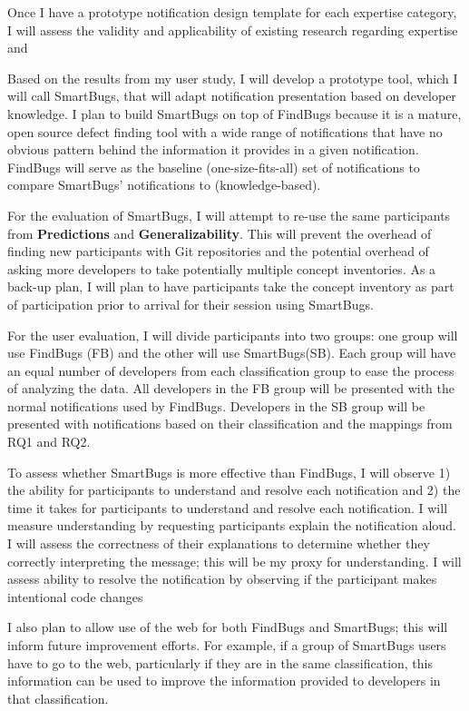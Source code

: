 \documentclass{llncs}
\begin{document}
Once I have a prototype notification design template for each expertise category, I will assess the validity and applicability of existing research regarding expertise and 

Based on the results from my user study, I will develop a prototype tool, which I will call SmartBugs, that will adapt notification presentation based on developer knowledge. I plan to build SmartBugs on top of FindBugs because it is a mature, open source defect finding tool with a wide range of notifications that have no obvious pattern behind the information it provides in a given notification. FindBugs will serve as the baseline (one-size-fits-all) set of notifications to compare SmartBugs' notifications to (knowledge-based).

For the evaluation of SmartBugs, I will attempt to re-use the same participants from \textbf{Predictions} and \textbf{Generalizability}. This will prevent the overhead of finding new participants with Git repositories and the potential overhead of asking more developers to take potentially multiple concept inventories.
As a back-up plan, I will plan to have participants take the concept inventory as part of participation prior to arrival for their session using SmartBugs.

For the user evaluation, I will divide participants into two groups: one group will use FindBugs (FB) and the other will use SmartBugs(SB). Each group will have an equal number of developers from each classification group to ease the process of analyzing the data. All developers in the FB group will be presented with the normal notifications used by FindBugs. Developers in the SB group will be presented with notifications based on their classification and the mappings from RQ1 and RQ2.

To assess whether SmartBugs is more effective than FindBugs, I will observe 1) the ability for participants to understand and resolve each notification and 2) the time it takes for participants to understand and resolve each notification. I will measure understanding by requesting participants explain the notification aloud. I will assess the correctness of their explanations to determine whether they correctly interpreting the message; this will be my proxy for understanding. I will assess ability to resolve the notification by observing if the participant makes intentional code changes

I also plan to allow use of the web for both FindBugs and SmartBugs; this will inform future improvement efforts. For example, if a group of SmartBugs users have to go to the web, particularly if they are in the same classification, this information can be used to improve the information provided to developers in that classification.
\end{document}
